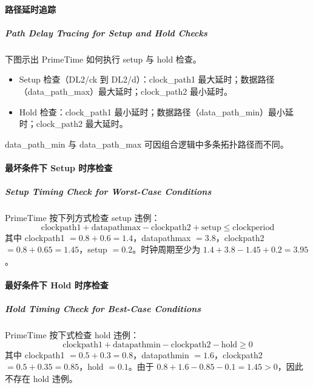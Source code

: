 \paragraph{路径延时追踪}
\subparagraph*{Path Delay Tracing for Setup and Hold Checks}

下图示出 PrimeTime 如何执行 setup 与 hold 检查。


\begin{itemize}
  \item Setup 检查（DL2/ck 到 DL2/d）：clock\_path1 最大延时；数据路径（data\_path\_max）最大延时；clock\_path2 最小延时。
  \item Hold 检查：clock\_path1 最小延时；数据路径（data\_path\_min）最小延时；clock\_path2 最大延时。
\end{itemize}

data\_path\_min 与 data\_path\_max 可因组合逻辑中多条拓扑路径而不同。

\paragraph{最坏条件下 Setup 时序检查}
\subparagraph*{Setup Timing Check for Worst-Case Conditions}


PrimeTime 按下列方式检查 setup 违例：
\[
\text{clockpath1} + \text{datapathmax} - \text{clockpath2} + \text{setup} \leq \text{clockperiod}
\]
其中 clockpath1 $= 0.8 + 0.6 = 1.4$，datapathmax $= 3.8$，clockpath2 $= 0.8 + 0.65 = 1.45$，setup $= 0.2$。时钟周期至少为 $1.4 + 3.8 - 1.45 + 0.2 = 3.95$。

\paragraph{最好条件下 Hold 时序检查}
\subparagraph*{Hold Timing Check for Best-Case Conditions}


PrimeTime 按下式检查 hold 违例：
\[
\text{clockpath1} + \text{datapathmin} - \text{clockpath2} - \text{hold} \geq 0
\]
其中 clockpath1 $=0.5+0.3=0.8$，datapathmin $=1.6$，clockpath2 $=0.5+0.35=0.85$，hold $=0.1$。由于 $0.8 + 1.6 - 0.85 - 0.1 = 1.45 > 0$，因此不存在 hold 违例。

